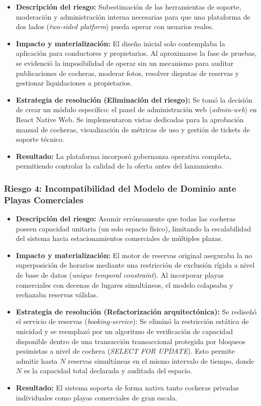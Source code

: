 \begin{itemize}
    \item \textbf{Descripción del riesgo:} Subestimación de las herramientas de soporte, moderación y administración interna necesarias para que una plataforma de dos lados (\textit{two-sided platform}) pueda operar con usuarios reales.
    \item \textbf{Impacto y materialización:} El diseño inicial solo contemplaba la aplicación para conductores y propietarios. Al aproximarse la fase de pruebas, se evidenció la imposibilidad de operar sin un mecanismo para auditar publicaciones de cocheras, moderar fotos, resolver disputas de reservas y gestionar liquidaciones a propietarios.
    \item \textbf{Estrategia de resolución (Eliminación del riesgo):} Se tomó la decisión de crear un módulo específico: el panel de administración web (\textit{admin-web}) en React Native Web. Se implementaron vistas dedicadas para la aprobación manual de cocheras, visualización de métricas de uso y gestión de tickets de soporte técnico.
    \item \textbf{Resultado:} La plataforma incorporó gobernanza operativa completa, permitiendo controlar la calidad de la oferta antes del lanzamiento.
\end{itemize}

\subsubsection{Riesgo 4: Incompatibilidad del Modelo de Dominio ante Playas Comerciales}

\begin{itemize}
    \item \textbf{Descripción del riesgo:} Asumir erróneamente que todas las cocheras poseen capacidad unitaria (un solo espacio físico), limitando la escalabilidad del sistema hacia estacionamientos comerciales de múltiples plazas.
    \item \textbf{Impacto y materialización:} El motor de reservas original aseguraba la no superposición de horarios mediante una restricción de exclusión rígida a nivel de base de datos (\textit{unique temporal constraint}). Al incorporar playas comerciales con decenas de lugares simultáneos, el modelo colapsaba y rechazaba reservas válidas.
    \item \textbf{Estrategia de resolución (Refactorización arquitectónica):} Se rediseñó el servicio de reservas (\textit{booking-service}): Se eliminó la restricción estática de unicidad y se reemplazó por un algoritmo de verificación de capacidad disponible dentro de una transacción transaccional protegida por bloqueos pesimistas a nivel de cochera (\textit{SELECT FOR UPDATE}). Esto permite admitir hasta $N$ reservas simultáneas en el mismo intervalo de tiempo, donde $N$ es la capacidad total declarada y auditada del espacio.
    \item \textbf{Resultado:} El sistema soporta de forma nativa tanto cocheras privadas individuales como playas comerciales de gran escala.
\end{itemize}

